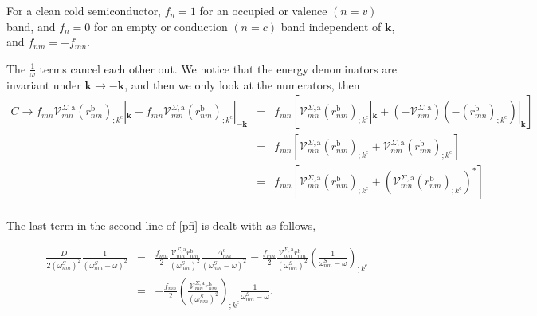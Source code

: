 \documentclass[11pt]{article}
\begin{document}
For a clean cold semiconductor, $f_{n} = 1$ for an occupied or valence $(n = v)$ band, and $f_{n} = 0$ for an empty or conduction $(n = c)$ band independent of $\mathbf{k}$, and $f_{nm}=-f_{mn}$.

The $\frac{1}{\omega}$ terms cancel each other out. We notice that the energy denominators are invariant under $\mathbf{k} \rightarrow - \mathbf{k}$, and then we only look at the numerators, then
\begin{eqnarray}\label{ct}
C \rightarrow f_{mn}\mathcal{V}^{\Sigma,\text{a}}_{mn}(r^{\text{b}}_{nm})_{;k^{\text{c}}}|_{\mathbf{k}} + f_{mn}\mathcal{V}^{\Sigma,\text{a}}_{mn}(r^{\text{b}}_{nm})_{;k^{\text{c}}}|_{-\mathbf{k}}
&=& f_{mn}\left[\mathcal{V}^{\Sigma,\text{a}}_{mn}(r^{\text{b}}_{nm})_{;k^{\text{c}}}|_{\mathbf{k}} + (-\mathcal{V}^{\Sigma,\text{a}}_{nm})(-(r^{\text{b}}_{mn})_{;k^{\text{c}}})|_{\mathbf{k}}\right]\nonumber\\
&=& f_{mn}\left[\mathcal{V}^{\Sigma,\text{a}}_{mn}(r^{\text{b}}_{nm})_{;k^{\text{c}}} + \mathcal{V}^{\Sigma,\text{a}}_{nm}(r^{\text{b}}_{mn})_{;k^{\text{c}}}\right]\nonumber\\
&=& f_{mn}\left[\mathcal{V}^{\Sigma,\text{a}}_{mn}(r^{\text{b}}_{nm})_{;k^{\text{c}}} + (\mathcal{V}^{\Sigma,\text{a}}_{mn}(r^{\text{b}}_{nm})_{;k^{\text{c}}})^*\right]\nonumber\\
\end{eqnarray}

The last term in the second line of \eqref{pfi} is dealt with as follows,

\begin{eqnarray}\label{dresn}
\frac{D}{2(\omega^S_{nm})^2}\frac{1}{(\omega^S_{nm}-\omega)^2} 
&=& \frac{f_{mn}}{2}\frac{\mathcal{V}^{\Sigma,\text{a}}_{mn}r^{\text{b}}_{nm}}{(\omega^S_{nm})^2}\frac{\Delta^{\text{c}}_{nm}}{(\omega^S_{nm}-\omega)^2} = \frac{f_{mn}}{2}\frac{\mathcal{V}^{\Sigma,\text{a}}_{mn}r^{\text{b}}_{nm}}{(\omega^S_{nm})^2}\left(\frac{1}{\omega^S_{nm}-\omega}\right)_{;k^{\text{c}}}\nonumber\\
&=& -\frac{f_{mn}}{2}\left(\frac{\mathcal{V}^{\Sigma,\text{a}}_{mn}r^{\text{b}}_{nm}}{(\omega^S_{nm})^2}\right)_{;k^{\text{c}}}\frac{1}{\omega^S_{nm}-\omega}.
\end{eqnarray} 
\end{document}
